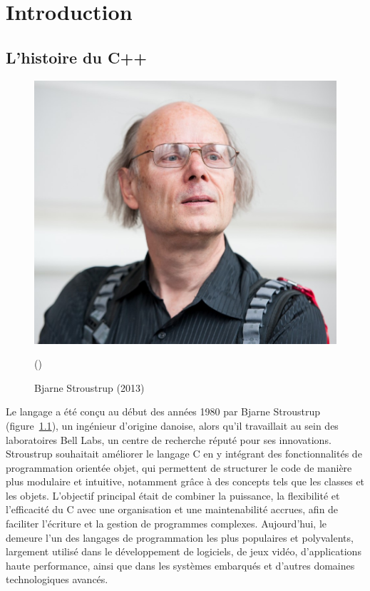 \lstset{  %
	language=bash,
	basicstyle=\ttfamily,
}

\chapter{Introduction}
\section{L'histoire du C++}

\begin{figure}[ht]
	\centering
	\includegraphics{Images/bjarne_stroustrup}
	\caption{Bjarne Stroustrup (2013)}()
	\label{bjarne_stroustrup}
\end{figure}

Le langage \cpp a été conçu au début des années 1980 par Bjarne Stroustrup (figure~\ref{bjarne_stroustrup}), un ingénieur d'origine danoise, alors qu'il travaillait au sein des laboratoires Bell Labs, un centre de recherche réputé pour ses innovations. Stroustrup souhaitait améliorer le langage C en y intégrant des fonctionnalités de programmation orientée objet, qui permettent de structurer le code de manière plus modulaire et intuitive, notamment grâce à des concepts tels que les classes et les objets. L'objectif principal était de combiner la puissance, la flexibilité et l'efficacité du C avec une organisation et une maintenabilité accrues, afin de faciliter l'écriture et la gestion de programmes complexes. Aujourd'hui, le \cpp demeure l'un des langages de programmation les plus populaires et polyvalents, largement utilisé dans le développement de logiciels, de jeux vidéo, d'applications haute performance, ainsi que dans les systèmes embarqués et d'autres domaines technologiques avancés.

